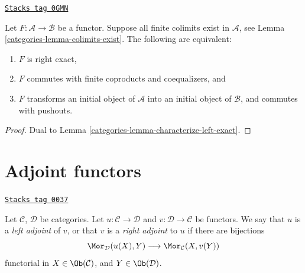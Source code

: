 \begin{lemma}
\label{categories-lemma-characterize-right-exact}
\href{https://stacks.math.columbia.edu/tag/0GMN}{\texttt{Stacks tag 0GMN}}

Let $F : \mathcal{A} \to \mathcal{B}$ be a functor.
Suppose all finite colimits exist in $\mathcal{A}$,
see Lemma \ref{categories-lemma-colimits-exist}.
The following are equivalent:
\begin{enumerate}
\item $F$ is right exact,
\item $F$ commutes with finite coproducts and coequalizers, and
\item $F$ transforms an initial object of $\mathcal{A}$
into an initial object of $\mathcal{B}$, and commutes with pushouts.
\end{enumerate}
\end{lemma}

\begin{proof}

Dual to Lemma \ref{categories-lemma-characterize-left-exact}.
\end{proof}

\section{Adjoint functors}
\label{categories-section-adjoint}
\begin{definition}[Adjoint]
\label{categories-definition-adjoint}
\href{https://stacks.math.columbia.edu/tag/0037}{\texttt{Stacks tag 0037}}

Let $\mathcal{C}$, $\mathcal{D}$ be categories.
Let $u : \mathcal{C} \to \mathcal{D}$ and
$v : \mathcal{D} \to \mathcal{C}$ be functors.
We say that $u$ is a {\it left adjoint} of $v$, or that
$v$ is a {\it right adjoint} to $u$ if there are bijections
$$
\Mor_\mathcal{D}(u(X), Y)
\longrightarrow
\Mor_\mathcal{C}(X, v(Y))
$$
functorial in $X \in \Ob(\mathcal{C})$, and
$Y \in \Ob(\mathcal{D})$.
\end{definition}

